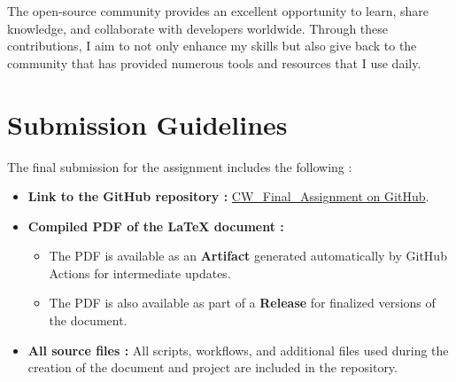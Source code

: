 \documentclass[12pt]{article}
\begin{document}
            The open-source community provides an excellent opportunity to learn, share knowledge, and collaborate with developers worldwide. Through these contributions, I aim to not only enhance my skills but also give back to the community that has provided numerous tools and resources that I use daily.
            
        \section*{Submission Guidelines}

            The final submission for the assignment includes the following :
            
            \begin{itemize}
                \item \textbf{Link to the GitHub repository :} \href{https://github.com/qazalarabali/CW_Final_Assignment}{CW\_Final\_Assignment on GitHub}.
                \item \textbf{Compiled PDF of the LaTeX document :} 
                    \begin{itemize}
                        \item The PDF is available as an \textbf{Artifact} generated automatically by GitHub Actions for intermediate updates.
                        \item The PDF is also available as part of a \textbf{Release} for finalized versions of the document.
                    \end{itemize}
                \item \textbf{All source files :} All scripts, workflows, and additional files used during the creation of the document and project are included in the repository.
            \end{itemize}
            
\end{document}
